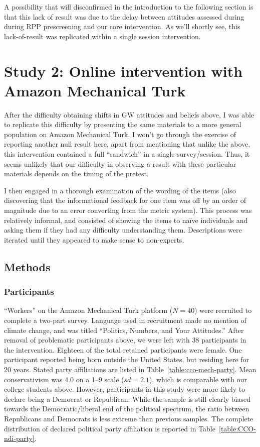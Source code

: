 A possibility that will disconfirmed in the introduction to the following
section is that this lack of result was due to the delay between attitudes
assessed during during RPP prescreening and our core intervention. As we'll
shortly see, this lack-of-result was replicated within a single session
intervention.

\section{Study 2: Online intervention with Amazon Mechanical Turk}
\label{sec:pro-mturk}

After the difficulty obtaining shifts in GW attitudes and beliefs above, I was
able to replicate this difficulty by presenting the same materials to a more
general population on Amazon Mechanical Turk. I won't go through the
exercise of reporting another null result here, apart from mentioning that
unlike the above, this intervention contained a full “sandwich” in a single
survey/session. Thus, it seems unlikely that our difficulty in observing a
result with these particular materials depends on the timing of the pretest.

I then engaged in a thorough examination of the wording of the items (also
discovering that the informational feedback for one item was off by an order of
magnitude due to an error converting from the metric system).  This process was
relatively informal, and consisted of showing the items to naïve individuals and
asking them if they had any difficulty understanding them.  Descriptions were
iterated until they appeared to make sense to non-experts.

\subsection{Methods}
\label{sec:CCO-ndi-methods}

\subsubsection{Participants}

“Workers” on the Amazon Mechanical Turk platform ($N=40$) were recruited to
complete a two-part survey. Language used in recruitment made no mention of
climate change, and was titled “Politics, Numbers, and Your Attitudes.” After
removal of problematic participants above, we were left with 38 participants in
the intervention. Eighteen of the total retained participants were female. One
participant reported being born outside the United States, but residing here for
20 years. Stated party affiliations are listed in
Table~\ref{table:cco-mech-party}. Mean conservativism was 4.0 on a 1--9 scale
($sd=2.1$), which is comparable with our college students above. However,
participants in this study were more likely to declare being a Democrat or
Republican.  While the sample is still clearly biased towards the
Democratic/liberal end of the political spectrum, the ratio between Republicans
and Democrats is less extreme than previous samples. The complete distribution
of declared political party affiliation is reported in
Table~\ref{table:CCO-ndi-party}.

